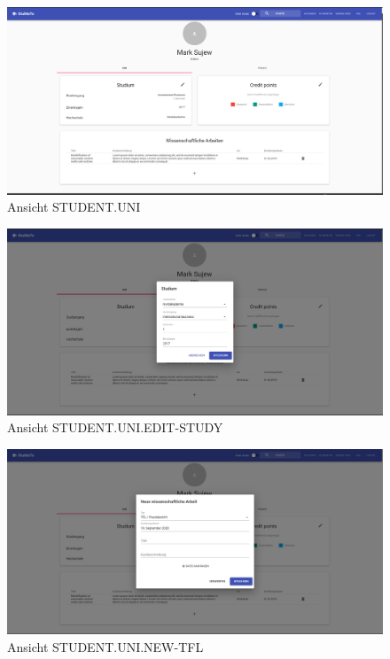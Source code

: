 \documentclass[
  12pt,
  ngerman,
  a4paper,
]{article}
\begin{document}
\begin{figure}
\centering
\includegraphics{./tex2pdf.-930e6666e1221838/7b7decc77183e1f8259e6c4265ee1b64e115eb3a.png}
\caption{Ansicht STUDENT.UNI}
\end{figure}

\begin{figure}
\centering
\includegraphics{./tex2pdf.-930e6666e1221838/592db6fdc0133bda72392ec386b61b235cfd34b2.png}
\caption{Ansicht STUDENT.UNI.EDIT-STUDY}
\end{figure}

\begin{figure}
\centering
\includegraphics{./tex2pdf.-930e6666e1221838/c8129831c98a80007f8fd71f31b9f91dda318a5d.png}
\caption{Ansicht STUDENT.UNI.NEW-TFL}
\end{figure}
\end{document}
